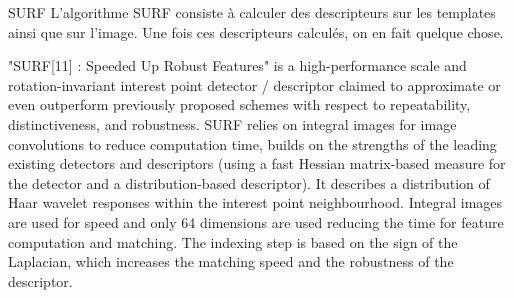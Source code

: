 SURF
L'algorithme SURF consiste à calculer des descripteurs sur les templates ainsi que sur l'image. Une fois ces descripteurs calculés, on en fait quelque chose.

"SURF[11] : Speeded Up Robust Features" is a high-performance scale and rotation-invariant interest point detector / descriptor claimed to approximate or even outperform previously proposed schemes with respect to repeatability, distinctiveness, and robustness. SURF relies on integral images for image convolutions to reduce computation time, builds on the strengths of the leading existing detectors and descriptors (using a fast Hessian matrix-based measure for the detector and a distribution-based descriptor). It describes a distribution of Haar wavelet responses within the interest point neighbourhood. Integral images are used for speed and only 64 dimensions are used reducing the time for feature computation and matching. The indexing step is based on the sign of the Laplacian, which increases the matching speed and the robustness of the descriptor.

